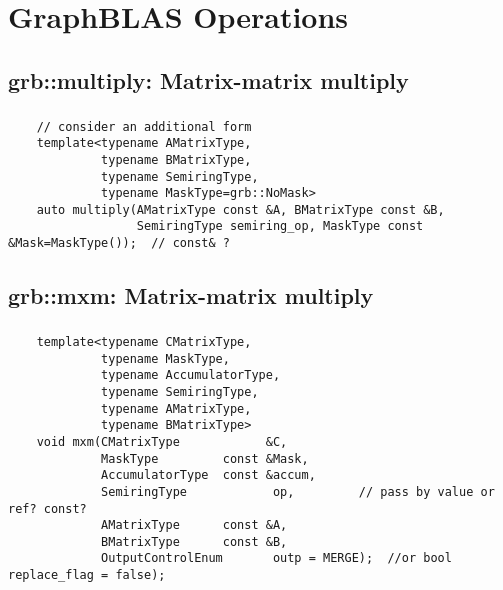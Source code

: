 
\chapter{GraphBLAS Operations}
\label{Ch:Operations}

\section{{\sf grb::multiply}: Matrix-matrix multiply}

\paragraph{\syntax}

\begin{verbatim}
    // consider an additional form
    template<typename AMatrixType,
             typename BMatrixType,
             typename SemiringType,
             typename MaskType=grb::NoMask>
    auto multiply(AMatrixType const &A, BMatrixType const &B,
                  SemiringType semiring_op, MaskType const &Mask=MaskType());  // const& ?
\end{verbatim}

\section{{\sf grb::mxm}: Matrix-matrix multiply}

\paragraph{\syntax}

\begin{verbatim}
    template<typename CMatrixType,
             typename MaskType,
             typename AccumulatorType,
             typename SemiringType,
             typename AMatrixType,
             typename BMatrixType>
    void mxm(CMatrixType            &C,
             MaskType         const &Mask,
             AccumulatorType  const &accum,
             SemiringType            op,         // pass by value or ref? const?
             AMatrixType      const &A,
             BMatrixType      const &B,
             OutputControlEnum       outp = MERGE);  //or bool replace_flag = false);
\end{verbatim}

